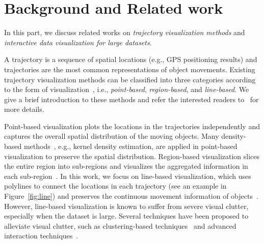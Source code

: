 \section{Background and Related work}\label{sec:rel}

In this part, we discuss related works on \textit{trajectory visualization methods} and \textit{interactive data visualization for large datasets}.

A trajectory is a sequence of spatial locations (e.g., GPS positioning results) and trajectories are the most common representations of object movements. Existing trajectory visualization methods can be classified into three categories according to the form of visualization~\cite{chen2015survey}, i.e., \textit{point-based}, \textit{region-based}, and \textit{line-based}. We give a brief introduction to these methods and refer the interested readers to~\cite{chen2015survey} for more details.


Point-based visualization plots the locations in the trajectories independently and captures the overall spatial distribution of the moving objects. Many density-based methods~\cite{liu2013vait,yang2016exploring,chae2014public,borruso2008network}, e.g., kernel density estimation, are applied in point-based visualization to preserve the spatial distribution. Region-based visualization slices the entire region into sub-regions and visualizes the aggregated information in each sub-region~\cite{guo2009flow,von2015mobilitygraphs}.
In this work, we focus on line-based visualization, which uses polylines to connect the locations in each trajectory (see an example in Figure~\ref{fig:line}) and preserves the continuous movement information of objects~\cite{guo2011tripvista,hurter2009fromdady,zeng2019route}. However, line-based visualization is known to suffer from severe visual clutter, especially when the dataset is large. Several techniques have been proposed to alleviate visual clutter, such as clustering-based techniques~\cite{von2015mobilitygraphs} and advanced interaction techniques~\cite{ferreira2013visual}.


